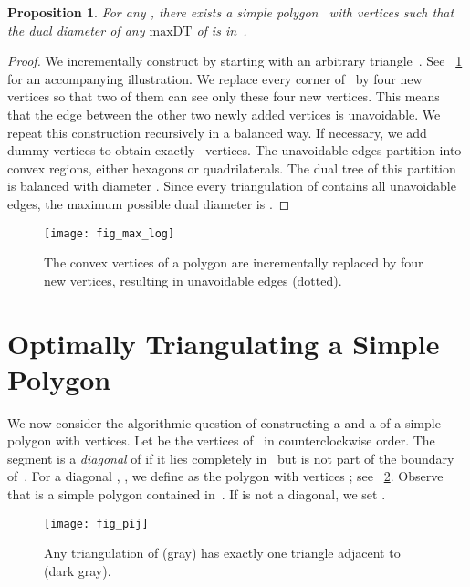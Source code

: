 \documentclass{article}
\newcommand{\MaxDT}{\ensuremath{\mathrm{maxDT}}}
\newtheorem{prop}[theorem]{Proposition}
\begin{document}
\begin{prop}
For any , there exists a simple polygon~ with  vertices such that the dual diameter of any \MaxDT{} of  is in~.
\end{prop}
\begin{proof}
We incrementally construct  by starting with an arbitrary 
triangle~.
See \figurename~\ref{fig:fig_max_log} for an accompanying illustration.
We replace every corner of~ by four new vertices so that two of them 
 can see only these four new vertices.
This means that the edge between the other two newly added vertices is 
unavoidable.
We repeat this construction recursively in a balanced way.
If necessary, we add dummy vertices to 
obtain exactly~ vertices.
The unavoidable edges partition  into convex regions, either 
hexagons or quadrilaterals. The dual tree of this partition is balanced 
with diameter . 
Since every triangulation of  contains all unavoidable edges,
the maximum possible dual diameter is .
\end{proof}

\begin{figure}
\centering
\texttt{[image: fig\_max\_log]}
\caption{The convex vertices of a polygon are incrementally replaced by four new vertices, resulting in unavoidable edges (dotted).}
\label{fig:fig_max_log}
\end{figure}

\section{Optimally Triangulating a Simple Polygon}\label{sec_poly}
We now consider the algorithmic question of constructing a  
and a  of a simple polygon  with  vertices. 
Let  be the vertices of~ in counterclockwise order.
The segment  is a \emph{diagonal} of  if it lies 
completely in~ but is not part of
the boundary of~.
For a diagonal , , we define  as the 
polygon with vertices ; 
see \figurename~\ref{fig_pij}.
Observe that  is a simple polygon contained in~.
If  is not a diagonal, we set .

\begin{figure}[tb]
\centering
\texttt{[image: fig\_pij]}
\caption{Any triangulation of  
(gray) has exactly one triangle adjacent to 
 (dark gray).}
\label{fig_pij}
\end{figure}
\end{document}
